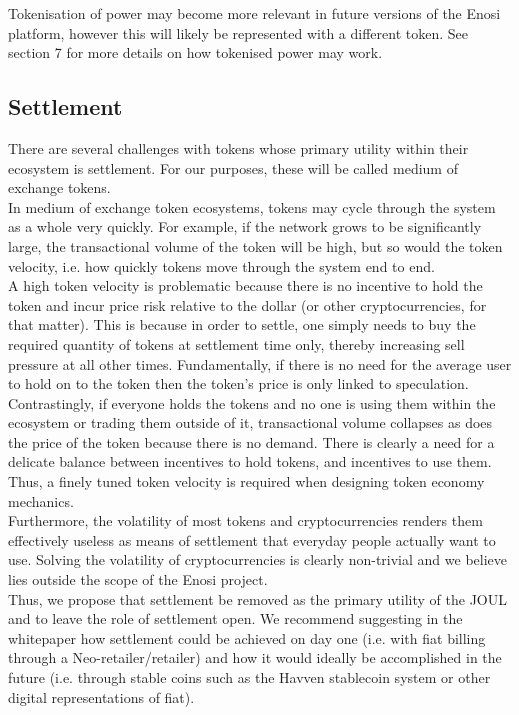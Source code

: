 \documentclass{article}
\theoremstyle{definition}
\theoremstyle{plain} %
\begin{document}
\noindent Tokenisation of power may become more relevant in future versions of the Enosi platform, however this will likely be represented with a different token. See section 7 for more details on how tokenised power may work.

\subsection{Settlement}

There are several challenges with tokens whose primary utility within their ecosystem is settlement. For our purposes, these will be called medium of exchange tokens.\\

\noindent In medium of exchange token ecosystems, tokens may cycle through the system as a whole very quickly. For example, if the network grows to be significantly large, the transactional volume of the token will be high, but so would the token velocity, i.e. how quickly tokens move through the system end to end.\\

\noindent A high token velocity is problematic because there is no incentive to hold the token and incur price risk relative to the dollar (or other cryptocurrencies, for that matter). This is because in order to settle, one simply needs to buy the required quantity of tokens at settlement time only, thereby increasing sell pressure at all other times. Fundamentally, if there is no need for the average user to hold on to the token then the token’s price is only linked to speculation.\\

\noindent Contrastingly, if everyone holds the tokens and no one is using them within the ecosystem or trading them outside of it, transactional volume collapses as does the price of the token because there is no demand. There is clearly a need for a delicate balance between incentives to hold tokens, and incentives to use them. Thus, a finely tuned token velocity is required when designing token economy mechanics.\\

\noindent Furthermore, the volatility of most tokens and cryptocurrencies renders them effectively useless as means of settlement that everyday people actually want to use. Solving the volatility of cryptocurrencies is clearly non-trivial and we believe lies outside the scope of the Enosi project.\\

\noindent Thus, we propose that settlement be removed as the primary utility of the JOUL and to leave the role of settlement open. We recommend suggesting in the whitepaper how settlement could be achieved on day one (i.e. with fiat billing through a Neo-retailer/retailer) and how it would ideally be accomplished in the future (i.e. through stable coins such as the Havven stablecoin system or other digital representations of fiat).
\end{document}
